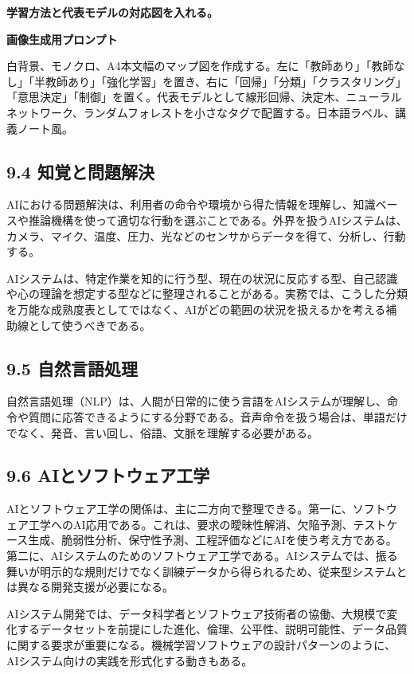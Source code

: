 \documentclass[a4paper,11pt]{ltjsarticle}
\begin{document}
\begin{todobox}
\textbf{学習方法と代表モデルの対応図を入れる。}\par
\textbf{画像生成用プロンプト}\par
白背景、モノクロ、A4本文幅のマップ図を作成する。左に「教師あり」「教師なし」「半教師あり」「強化学習」を置き、右に「回帰」「分類」「クラスタリング」「意思決定」「制御」を置く。代表モデルとして線形回帰、決定木、ニューラルネットワーク、ランダムフォレストを小さなタグで配置する。日本語ラベル、講義ノート風。

\end{todobox}

\subsection{9.4 知覚と問題解決}

AIにおける問題解決は、利用者の命令や環境から得た情報を理解し、知識ベースや推論機構を使って適切な行動を選ぶことである。外界を扱うAIシステムは、カメラ、マイク、温度、圧力、光などのセンサからデータを得て、分析し、行動する。

AIシステムは、特定作業を知的に行う型、現在の状況に反応する型、自己認識や心の理論を想定する型などに整理されることがある。実務では、こうした分類を万能な成熟度表としてではなく、AIがどの範囲の状況を扱えるかを考える補助線として使うべきである。

\subsection{9.5 自然言語処理}

自然言語処理（NLP）は、人間が日常的に使う言語をAIシステムが理解し、命令や質問に応答できるようにする分野である。音声命令を扱う場合は、単語だけでなく、発音、言い回し、俗語、文脈を理解する必要がある。

\subsection{9.6 AIとソフトウェア工学}

AIとソフトウェア工学の関係は、主に二方向で整理できる。第一に、ソフトウェア工学へのAI応用である。これは、要求の曖昧性解消、欠陥予測、テストケース生成、脆弱性分析、保守性予測、工程評価などにAIを使う考え方である。第二に、AIシステムのためのソフトウェア工学である。AIシステムでは、振る舞いが明示的な規則だけでなく訓練データから得られるため、従来型システムとは異なる開発支援が必要になる。

AIシステム開発では、データ科学者とソフトウェア技術者の協働、大規模で変化するデータセットを前提にした進化、倫理、公平性、説明可能性、データ品質に関する要求が重要になる。機械学習ソフトウェアの設計パターンのように、AIシステム向けの実践を形式化する動きもある。
\end{document}
